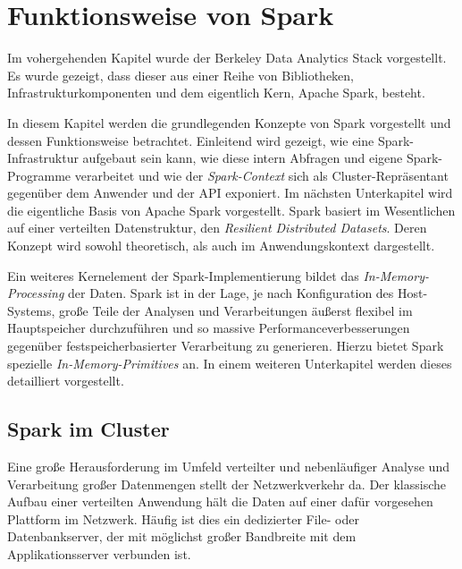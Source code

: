 \chapter{Funktionsweise von Spark}
\label{chapter:funktionsweise von Spark}


Im vohergehenden Kapitel wurde der Berkeley Data Analytics Stack vorgestellt. Es wurde gezeigt, dass dieser aus einer Reihe von Bibliotheken, Infrastrukturkomponenten und dem eigentlich Kern, Apache Spark, besteht.

In diesem Kapitel werden die grundlegenden Konzepte von Spark vorgestellt und dessen Funktionsweise betrachtet. Einleitend wird gezeigt, wie eine Spark-Infrastruktur aufgebaut sein kann, wie diese intern Abfragen und eigene Spark-Programme verarbeitet und wie der \textit{Spark-Context} sich als Cluster-Repräsentant gegenüber dem Anwender und der API exponiert. Im nächsten Unterkapitel wird die eigentliche Basis von Apache Spark vorgestellt. Spark basiert im Wesentlichen auf einer verteilten Datenstruktur, den \textit{Resilient Distributed Datasets}. Deren Konzept wird sowohl theoretisch, als auch im Anwendungskontext dargestellt. 

Ein weiteres Kernelement der Spark-Implementierung bildet das \textit{In-Memory-Processing} der Daten. Spark ist in der Lage, je nach Konfiguration des Host-Systems, große Teile der Analysen und Verarbeitungen äußerst flexibel im Hauptspeicher durchzuführen und so massive Performanceverbesserungen gegenüber festspeicherbasierter Verarbeitung zu generieren. Hierzu bietet Spark spezielle \textit{In-Memory-Primitives} an. In einem weiteren Unterkapitel werden dieses detailliert vorgestellt. 



\section{Spark im Cluster}
\label{section:spark im cluster}

Eine große Herausforderung im Umfeld verteilter und nebenläufiger Analyse und Verarbeitung großer Datenmengen stellt der Netzwerkverkehr da. Der klassische Aufbau einer verteilten Anwendung hält die Daten auf einer dafür vorgesehen Plattform im Netzwerk. Häufig ist dies ein dedizierter File- oder Datenbankserver, der mit möglichst großer Bandbreite mit dem Applikationsserver verbunden ist. 

